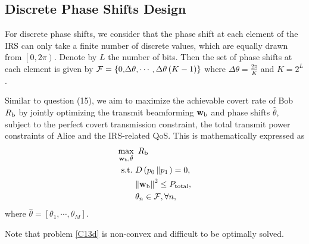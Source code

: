 \documentclass[10pt,journal,letterpaper,twocolumn,twoside]{IEEEtran} %
\begin{document}
 \subsection{Discrete Phase Shifts Design}

For discrete phase shifts,  we
consider that the phase shift at each element of the IRS can only
take a finite number of discrete values, which are equally drawn from
$\left[ {0,2\pi } \right)$. Denote by $L$ the number of bits. Then the set of phase shifts at each element is given by
${\cal {F}} = \left\{ {{\rm{0,}}\Delta \theta , \cdots ,\Delta \theta \left( {K - 1} \right)} \right\}$ where $\Delta \theta  = \frac{{2\pi }}{K}$ and $K = {2^{L}}$.

Similar to question (15), we aim to maximize the achievable covert  rate of Bob  ${R_{\rm{b}}}$ by jointly optimizing the transmit beamforming ${{\bf{w}}_{\rm{b}}}$ and phase shifts ${{\hat \theta }}$,
   subject to the   perfect covert transmission constraint, the total transmit power constraints of Alice and the IRS-related QoS. This is mathematically expressed as
\begin{subequations}\label{C13d}
\begin{align}
\mathop {\max }\limits_{{{\bf{w}}_{\rm{b}}},{{\hat \theta }}} {\rm{ }}&~{R_{\rm{b}}} \hfill \label{C14ad}\\
  {\text{s}}{\text{.t}}{\text{.}}~&D\left( {{p_0}\left\| {{p_1}} \right.} \right)= 0, \hfill \label{C14bd}\\
 & {\left\| {{{\mathbf{w}}_{\rm{b}}}} \right\|^2} \le  {P_{{\rm{total}}}}, \hfill \label{C14cd}\\
 &{\theta _n} \in {\cal {F}}, \forall n,\label{C14d_d}
  \end{align}
\end{subequations}
where ${\hat \theta }  = \left[ {{\theta _1}, \cdots ,{\theta _M}} \right]$.

  Note that problem \eqref{C13d} is   non-convex and  difficult to be optimally solved.
%
\end{document}
